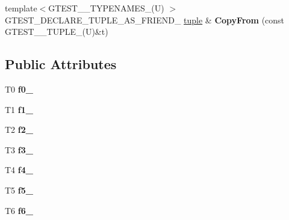 \begin{DoxyCompactItemize}
\item 
\hypertarget{classstd_1_1tr1_1_1tuple_a3d06fb121d18b6e1c10d14f9e966618d}{}{\footnotesize template$<$G\+T\+E\+S\+T\+\_\+\_\+\+T\+Y\+P\+E\+N\+A\+M\+E\+S\+\_\+(\+U) $>$ }\\G\+T\+E\+S\+T\+\_\+\+D\+E\+C\+L\+A\+R\+E\+\_\+\+T\+U\+P\+L\+E\+\_\+\+A\+S\+\_\+\+F\+R\+I\+E\+N\+D\+\_\+ \hyperlink{classstd_1_1tr1_1_1tuple}{tuple} \& {\bfseries Copy\+From} (const G\+T\+E\+S\+T\+\_\+\_\+\+T\+U\+P\+L\+E\+\_\+(U)\&t)\label{classstd_1_1tr1_1_1tuple_a3d06fb121d18b6e1c10d14f9e966618d}

\end{DoxyCompactItemize}
\subsection*{Public Attributes}
\begin{DoxyCompactItemize}
\item 
\hypertarget{classstd_1_1tr1_1_1tuple_a771b1d99e8800fb284acd04bca838cbb}{}T0 {\bfseries f0\+\_\+}\label{classstd_1_1tr1_1_1tuple_a771b1d99e8800fb284acd04bca838cbb}

\item 
\hypertarget{classstd_1_1tr1_1_1tuple_a7cccf899dedc626c51fa4f6921d0ac52}{}T1 {\bfseries f1\+\_\+}\label{classstd_1_1tr1_1_1tuple_a7cccf899dedc626c51fa4f6921d0ac52}

\item 
\hypertarget{classstd_1_1tr1_1_1tuple_aaec06c27366502dc332ef96878628f84}{}T2 {\bfseries f2\+\_\+}\label{classstd_1_1tr1_1_1tuple_aaec06c27366502dc332ef96878628f84}

\item 
\hypertarget{classstd_1_1tr1_1_1tuple_ad4d3673e0d5c07c392c02e335fe978ff}{}T3 {\bfseries f3\+\_\+}\label{classstd_1_1tr1_1_1tuple_ad4d3673e0d5c07c392c02e335fe978ff}

\item 
\hypertarget{classstd_1_1tr1_1_1tuple_ab662f1051c2302d065796383848db6c4}{}T4 {\bfseries f4\+\_\+}\label{classstd_1_1tr1_1_1tuple_ab662f1051c2302d065796383848db6c4}

\item 
\hypertarget{classstd_1_1tr1_1_1tuple_a32d8cd6f180c0a77d83733fc65423657}{}T5 {\bfseries f5\+\_\+}\label{classstd_1_1tr1_1_1tuple_a32d8cd6f180c0a77d83733fc65423657}

\item 
\hypertarget{classstd_1_1tr1_1_1tuple_a597beab3af3f95c84408491ab14632b0}{}T6 {\bfseries f6\+\_\+}\label{classstd_1_1tr1_1_1tuple_a597beab3af3f95c84408491ab14632b0}


\end{DoxyCompactItemize}
